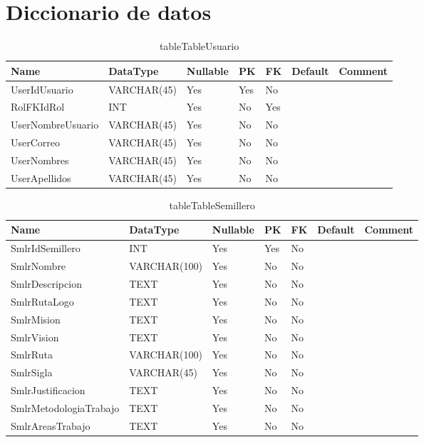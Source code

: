 \chapter{Diccionario de datos}


\begin{table}
	\caption{tableTableUsuario}
	\label{labelTableUsuario}
	\begin{tabular}{ |l|l|l|l|l|l|l| }
		\hline
		Name & DataType & Nullable & PK & FK & Default & Comment \\ \hline
		UserIdUsuario & VARCHAR(45) & Yes & Yes & No &  & \\ \hline 
		RolFKIdRol & INT & Yes & No & Yes &  & \\ \hline 
		UserNombreUsuario & VARCHAR(45) & Yes & No & No &  & \\ \hline 
		UserCorreo & VARCHAR(45) & Yes & No & No &  & \\ \hline 
		UserNombres & VARCHAR(45) & Yes & No & No &  & \\ \hline 
		UserApellidos & VARCHAR(45) & Yes & No & No &  & \\ \hline 
		
	\end{tabular}
\end{table}


\begin{table}
	\caption{tableTableSemillero}
	\label{labelTableSemillero}
	\begin{tabular}{ |l|l|l|l|l|l|l| }
		\hline
		Name & DataType & Nullable & PK & FK & Default & Comment \\ \hline
		SmlrIdSemillero & INT & Yes & Yes & No &  & \\ \hline 
		SmlrNombre & VARCHAR(100) & Yes & No & No &  & \\ \hline 
		SmlrDescripcion & TEXT & Yes & No & No &  & \\ \hline 
		SmlrRutaLogo & TEXT & Yes & No & No &  & \\ \hline 
		SmlrMision & TEXT & Yes & No & No &  & \\ \hline 
		SmlrVision & TEXT & Yes & No & No &  & \\ \hline 
		SmlrRuta & VARCHAR(100) & Yes & No & No &  & \\ \hline 
		SmlrSigla & VARCHAR(45) & Yes & No & No &  & \\ \hline 
		SmlrJustificacion & TEXT & Yes & No & No &  & \\ \hline 
		SmlrMetodologiaTrabajo & TEXT & Yes & No & No &  & \\ \hline 
		SmlrAreasTrabajo & TEXT & Yes & No & No &  & \\ \hline 
		
	\end{tabular}
\end{table}


